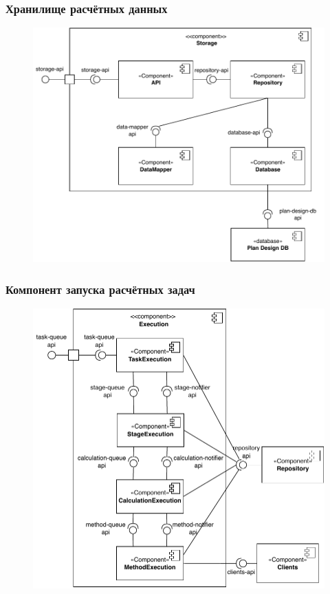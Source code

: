 \begin{frame}
\frametitle{Хранилище расчётных данных}
\begin{figure}
    \includegraphics[scale=.55]{pictures/architecture/storage_component_common}
\end{figure}
\end{frame}


\begin{frame}
\frametitle{Компонент запуска расчётных задач}
\begin{figure}
    \includegraphics[scale=.5]{pictures/architecture/orchestrator_component_detailed}
\end{figure}
\end{frame}


